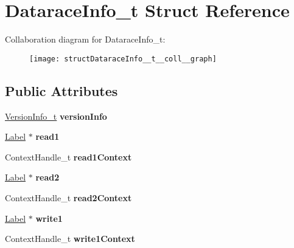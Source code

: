 \hypertarget{structDataraceInfo__t}{\section{Datarace\-Info\-\_\-t Struct Reference}
\label{structDataraceInfo__t}
}


Collaboration diagram for Datarace\-Info\-\_\-t\-:
\nopagebreak
\begin{figure}[H]
\begin{center}
\leavevmode
\texttt{[image: structDataraceInfo\_\_t\_\_coll\_\_graph]}
\end{center}
\end{figure}
\subsection*{Public Attributes}
\begin{DoxyCompactItemize}
\item 
\hypertarget{structDataraceInfo__t_ab36194d14a285340d69b6ae632578aac}{\hyperlink{structVersionInfo__t}{Version\-Info\-\_\-t} {\bfseries version\-Info}}\label{structDataraceInfo__t_ab36194d14a285340d69b6ae632578aac}

\item 
\hypertarget{structDataraceInfo__t_ae5052c95ee3544f641057f4a94c7622e}{\hyperlink{classLabel}{Label} $\ast$ {\bfseries read1}}\label{structDataraceInfo__t_ae5052c95ee3544f641057f4a94c7622e}

\item 
\hypertarget{structDataraceInfo__t_a057145e3b0a74bdd1a6387423c5cae7a}{Context\-Handle\-\_\-t {\bfseries read1\-Context}}\label{structDataraceInfo__t_a057145e3b0a74bdd1a6387423c5cae7a}

\item 
\hypertarget{structDataraceInfo__t_addb7e5a4795b99a668ca77030804a2c9}{\hyperlink{classLabel}{Label} $\ast$ {\bfseries read2}}\label{structDataraceInfo__t_addb7e5a4795b99a668ca77030804a2c9}

\item 
\hypertarget{structDataraceInfo__t_a4ccb7c8a6c162796812a365706ab3b62}{Context\-Handle\-\_\-t {\bfseries read2\-Context}}\label{structDataraceInfo__t_a4ccb7c8a6c162796812a365706ab3b62}

\item 
\hypertarget{structDataraceInfo__t_a7427c9360d286bfa6fc47edbca0be95a}{\hyperlink{classLabel}{Label} $\ast$ {\bfseries write1}}\label{structDataraceInfo__t_a7427c9360d286bfa6fc47edbca0be95a}

\item 
\hypertarget{structDataraceInfo__t_a7fce4fa243d730e209c41de80cee9570}{Context\-Handle\-\_\-t {\bfseries write1\-Context}}\label{structDataraceInfo__t_a7fce4fa243d730e209c41de80cee9570}

\end{DoxyCompactItemize}


